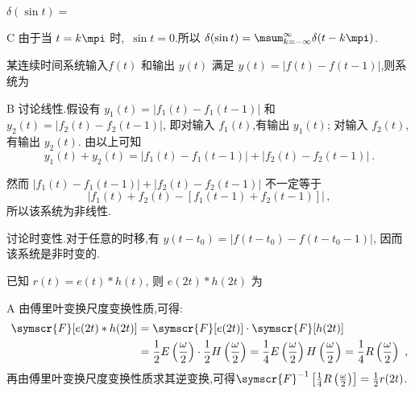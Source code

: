 \documentclass[list,answers,csize4,custom]{sysuexam}
\begin{document}
\begin{groups}
\begin{questions}[rs]
    \question[5] $\delta(\sin t)=$\kh
    \begin{solution}
        \answer C
        \analysis 由于当 $t=k \mpi$ 时,~$\sin t=0$.所以 $\delta(\sin t)=\msum_{k=-\infty}^{\infty} \delta(t-k \mpi)$.
    \end{solution}

    \question[5] 某连续时间系统输入$f(t)$ 和输出 $y(t)$ 满足 $y(t)=|f(t)-f(t-1)|$,则系统为\kh
    \begin{solution}
        \answer B
        \analysis 讨论线性.假设有 $y_{1}(t)=\left|f_{1}(t)-f_{1}(t-1)\right|$ 和 $y_{2}(t)=\left|f_{2}(t)-f_{2}(t-1)\right|$, 即对输入 $f_{1}(t)$,有输出 $y_{1}(t) $; 对输入 $f_{2}(t)$, 有输出 $y_{2}(t) $. 由以上可知$$
        y_{1}(t)+y_{2}(t)=\left|f_{1}(t)-f_{1}(t-1)\right|+\left|f_{2}(t)-f_{2}(t-1)\right|\ .
        $$

        \sj 然而 $\left|f_{1}(t)-f_{1}(t-1)\right|+\left|f_{2}(t)-f_{2}(t-1)\right|$ 不一定等于
        $$\left| f_{1}(t)+f_{2}(t)-\left[f_{1}(t-1)+f_{2}(t-1)\right]\right|\,,$$所以该系统为非线性.

        \sj 讨论时变性.对于任意的时移,有 $y\left(t-t_{0}\right)=\left|f\left(t-t_{0}\right)-f\left(t-t_{0}-1\right)\right|$, 因而该系统是非时变的.
    \end{solution}

    \question[5] 已知 $r(t)=e(t) * h(t)$, 则 $e(2 t) * h(2 t)$ 为\kh
    \begin{solution}
        \answer A
        \analysis 由傅里叶变换尺度变换性质,可得:$$
        \begin{aligned}
        \symscr{F}[e(2 t) * h(2 t)]&=\symscr{F}[e(2 t)] \cdot \symscr{F}[h(2 t)]\\
        &=\frac{1}{2} E\left(\frac{\omega}{2}\right) \cdot \frac{1}{2} H\left(\frac{\omega}{2}\right)=\frac{1}{4} E\left(\frac{\omega}{2}\right) H\left(\frac{\omega}{2}\right)=\frac{1}{4} R\left(\frac{\omega}{2}\right)\ ,
        \end{aligned}$$
        再由傅里叶变换尺度变换性质求其逆变换,可得$\symscr{F}^{-1}\left[\frac{1}{4} R\left(\frac{\omega}{2}\right)\right]=\frac{1}{2} r(2 t)$.
    \end{solution}


\end{questions}
\end{groups}
\end{document}
